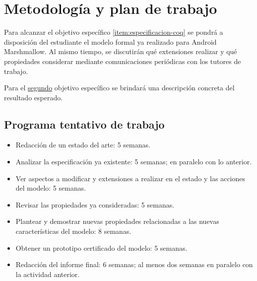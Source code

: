 \section{Metodología y plan de trabajo}

Para alcanzar el objetivo específico \ref{item:especificacion-coq} se pondrá a
disposición del estudiante el modelo formal ya realizado para Android
Marshmallow. Al mismo tiempo, se discutirán qué extensiones realizar y qué
propiedades considerar mediante comunicaciones periódicas con los tutores de
trabajo.

Para el \hyperref[item:prototipo]{segundo} objetivo específico se brindará una
descripción concreta del resultado esperado.

\subsection{Programa tentativo de trabajo}
\begin{itemize}
    \item Redacción de un estado del arte: 5 semanas.
    \item Analizar la especificación ya existente: 5 semanas; en paralelo con lo anterior.
    \item Ver aspectos a modificar y extensiones a realizar en el estado y las
          acciones del modelo: 5 semanas.
    \item Revisar las propiedades ya consideradas: 5 semanas.
    \item Plantear y demostrar nuevas propiedades relacionadas a las nuevas
          características del modelo: 8 semanas.
    \item Obtener un prototipo certificado del modelo: 5 semanas.
    \item Redacción del informe final: 6 semanas; al menos dos semanas en paralelo con la actividad anterior.
\end{itemize}